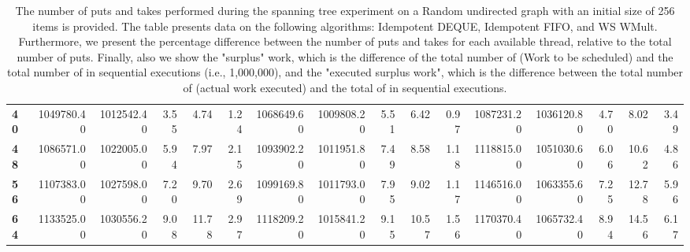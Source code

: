 \begin{table}[!ht]
{\begin{tabular}{lrrrrrrrrrrrrrrr}
\textbf{40} &       1049780.40 & 1012542.40 &           3.55 &        4.74 &                 1.24 &      1068649.60 & 1009808.20 &           5.51 &        6.42 &                 0.97 & 1087231.20 & 1036120.80 &           4.70 &        8.02 &                 3.49 \\
\textbf{48} &       1086571.00 & 1022005.00 &           5.94 &        7.97 &                 2.15 &      1093902.20 & 1011951.80 &           7.49 &        8.58 &                 1.18 & 1118815.00 & 1051030.60 &           6.06 &       10.62 &                 4.86 \\
\textbf{56} &       1107383.00 & 1027598.00 &           7.20 &        9.70 &                 2.69 &      1099169.80 & 1011793.00 &           7.95 &        9.02 &                 1.17 & 1146516.00 & 1063355.60 &           7.25 &       12.78 &                 5.96 \\
\textbf{64} &       1133525.00 & 1030556.20 &           9.08 &       11.78 &                 2.97 &      1118209.20 & 1015841.20 &           9.15 &       10.57 &                 1.56 & 1170370.40 & 1065732.40 &           8.94 &       14.56 &                 6.17 \\
\bottomrule
\end{tabular}}
\label{difference-Random_undirected-256-IDEMPOTENT_DEQUE-IDEMPOTENT_FIFO-WS_NC_MULT_OPT}
\caption{The number of puts and takes performed during the
    spanning tree experiment on a Random undirected graph with an initial size
    of 256 items is provided. The table presents data on the
    following algorithms: Idempotent DEQUE, Idempotent FIFO, and
    WS WMult. Furthermore, we present the percentage difference
    between the number of puts and takes for each available thread,
    relative to the total number of puts. Finally, also we show the
    "surplus" work, which is the difference of the total number of
    \Puts (Work to be scheduled) and the total number of \Puts in
    sequential executions (i.e., 1,000,000), and the "executed surplus
    work", which is the difference between the total number of \Takes
    (actual work executed) and the total of \Takes in sequential
    executions.}
\end{table}
